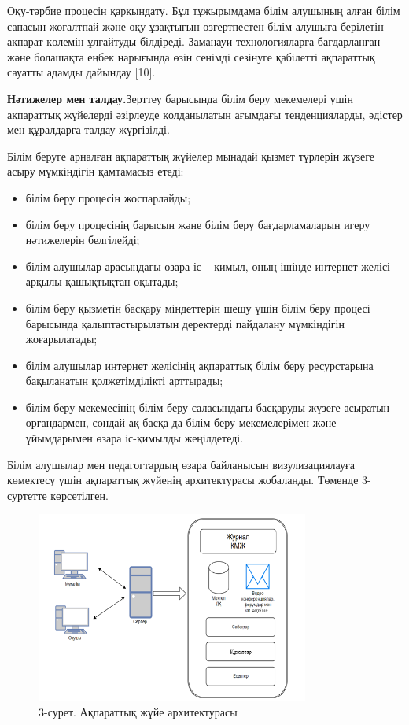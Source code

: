 Оқу-тәрбие процесін қарқындату. Бұл тұжырымдама білім алушының алған
білім сапасын жоғалтпай және оқу ұзақтығын өзгертпестен білім алушыға
берілетін ақпарат көлемін ұлғайтуды білдіреді. Заманауи технологияларға
бағдарланған және болашақта еңбек нарығында өзін сенімді сезінуге
қабілетті ақпараттық сауатты адамды дайындау {[}10{]}.

{\bfseries Нәтижелер мен талдау.}Зерттеу барысында білім беру мекемелері
үшін ақпараттық жүйелерді әзірлеуде қолданылатын ағымдағы
тенденцияларды, әдістер мен құралдарға талдау жүргізілді.

Білім беруге арналған ақпараттық жүйелер мынадай қызмет түрлерін жүзеге
асыру мүмкіндігін қамтамасыз етеді:

\begin{itemize}
\item
  білім беру процесін жоспарлайды;
\item
  білім беру процесінің барысын және білім беру бағдарламаларын игеру
  нәтижелерін белгілейді;
\item
  білім алушылар арасындағы өзара іс -- қимыл, оның ішінде-интернет
  желісі арқылы қашықтықтан оқытады;
\item
  білім беру қызметін басқару міндеттерін шешу үшін білім беру процесі
  барысында қалыптастырылатын деректерді пайдалану мүмкіндігін
  жоғарылатады;
\item
  білім алушылар интернет желісінің ақпараттық білім беру ресурстарына
  бақыланатын қолжетімділікті арттырады;
\item
  білім беру мекемесінің білім беру саласындағы басқаруды жүзеге
  асыратын органдармен, сондай-ақ басқа да білім беру мекемелерімен және
  ұйымдарымен өзара іс-қимылды жеңілдетеді.
\end{itemize}

Білім алушылар мен педагогтардың өзара байланысын визулизациялауға
көмектесу үшін ақпараттық жүйенің архитектурасы жобаланды. Төменде
3-суртетте көрсетілген.

\begin{figure}[H]
	\centering
	\includegraphics[width=0.8\textwidth]{media/ict/image101}
	\caption*{3-сурет. Ақпараттық жүйе архитектурасы}
\end{figure}




